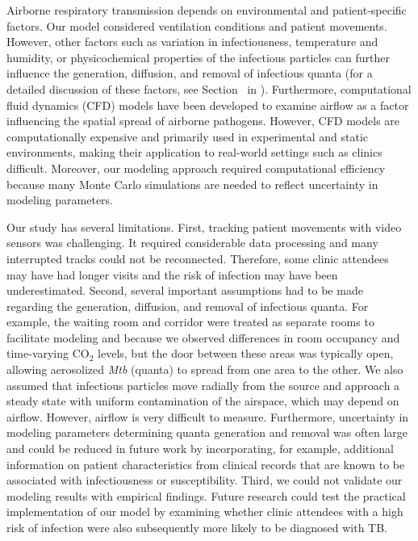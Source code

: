 \documentclass[fleqn,11pt]{wlscirep}
\begin{document}
Airborne respiratory transmission depends on environmental and patient-specific factors. Our model considered ventilation conditions and patient movements. However, other factors such as variation in infectiousness, temperature and humidity, or physicochemical properties of the infectious particles can further influence the generation, diffusion, and removal of infectious quanta (for a detailed discussion of these factors, see Section~ in \supp). Furthermore, computational fluid dynamics (CFD) models have been developed to examine airflow as a factor influencing the spatial spread of airborne pathogens\cite{Vuorinen2020SafSci,Jung2021InfectChemo,Li2021BuildEnv,Yan2023BE,Qian2009BE,Li2022SOTTE}. However, CFD models are computationally expensive and primarily used in experimental and static environments, making their application to real-world settings such as clinics difficult. Moreover, our modeling approach required computational efficiency because many Monte Carlo simulations are needed to reflect uncertainty in modeling parameters. 

Our study has several limitations. First, tracking patient movements with video sensors was challenging. It required considerable data processing and many interrupted tracks could not be reconnected. Therefore, some clinic attendees may have had longer visits and the risk of infection may have been underestimated. Second, several important assumptions had to be made regarding the generation, diffusion, and removal of infectious quanta. For example, the waiting room and corridor were treated as separate rooms to facilitate modeling and because we observed differences in room occupancy and time-varying CO$_2$ levels, but the door between these areas was typically open, allowing aerosolized \emph{Mtb} (quanta) to spread from one area to the other. We also assumed that infectious particles move radially from the source and approach a steady state with uniform contamination of the airspace, which may depend on airflow. However, airflow is very difficult to measure. Furthermore, uncertainty in modeling parameters determining quanta generation and removal was often large and could be reduced in future work by incorporating, for example, additional information on patient characteristics from clinical records that are known to be associated with infectiousness\cite{Escombe2008PLoSMed} or susceptibility\cite{Furin2019Lancet}. Third, we could not validate our modeling results with empirical findings. Future research could test the practical implementation of our model by examining whether clinic attendees with a high risk of infection were also subsequently more likely to be diagnosed with TB.  
\end{document}
